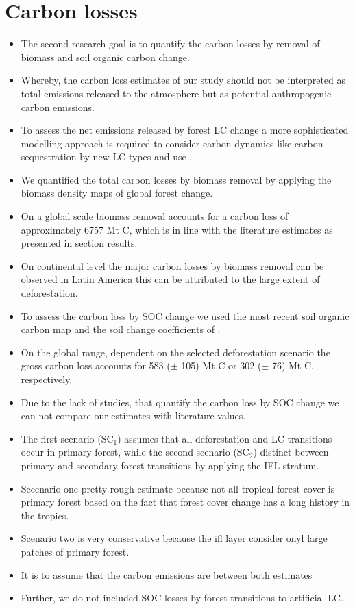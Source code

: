	\section{Carbon losses}
		\begin{itemize}
			\item The second research goal is to quantify the carbon losses by removal of biomass and soil organic carbon change.
			\item Whereby, the carbon loss estimates of our study should not be interpreted as total emissions released to the atmosphere but as potential anthropogenic carbon emissions.
			\item To assess the net emissions released by forest \ac{LC} change a more sophisticated modelling approach is required to consider carbon dynamics like carbon sequestration by new \ac{LC} types and use .
			\item We quantified the total carbon losses by biomass removal by applying the biomass density maps of global forest change.
			\item On a global scale biomass removal accounts for a carbon loss of approximately 6757 Mt C, which is in line with the literature estimates as presented in section results.
			\item On continental level the major carbon losses by biomass removal can be observed in Latin America this can be attributed to the large extent of deforestation.
			\item To assess the carbon loss by \ac{SOC} change we used the most recent soil organic carbon map and the soil change coefficients of \citet{Don2010}.
			\item On the global range, dependent on the selected deforestation scenario the gross carbon loss accounts for 583 ($\pm$ 105) Mt C or 302 ($\pm$ 76) Mt C, respectively.
			\item Due to the lack of studies, that quantify the carbon loss by \ac{SOC} change we can not compare our estimates with literature values.

			\item The first scenario (SC$_1$) assumes that all deforestation and \ac{LC} transitions occur in primary forest, while the second scenario (SC$_2$) distinct between primary and secondary forest transitions by applying the \ac{IFL} stratum.
			\item Secenario one pretty rough estimate because not all tropical forest cover is primary forest based on the fact that forest cover change has a long history in the tropics.
			\item Scenario two is very conservative because the ifl layer consider onyl large patches of primary forest.
			\item It is to assume that the carbon emissions are between both estimates
			\item Further, we do not included \ac{SOC} losses by forest transitions to artificial \ac{LC}.
            

\end{itemize}
